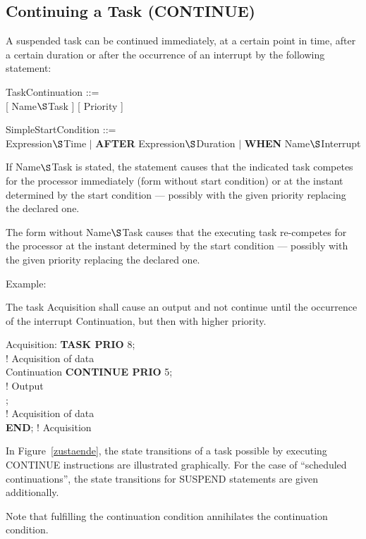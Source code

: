 \subsection{Continuing a Task (CONTINUE)}    %

A suspended task can be continued immediately, at a certain point in
time, after a certain duration or after the occurrence of an interrupt by
the following statement:

TaskContinuation ::=\\
 [ Name$\S $Task ] [ Priority ]\

SimpleStartCondition ::= \\
 Expression$\S $Time $\mid$ {\bf AFTER} Expression$\S $Duration $\mid$ {\bf WHEN} Name$\S $Interrupt

If Name$\S $Task is stated, the statement causes that the indicated task
competes for the processor immediately (form without start condition) or
at the instant determined by the start condition --- possibly with the
given priority replacing the declared one.

The form without Name$\S $Task causes that the executing task re-competes
for the processor at the instant determined by the start condition ---
possibly with the given priority replacing the declared one.

Example:

The task Acquisition shall cause an output and not continue until
the occurrence of the interrupt Continuation, but then with higher
priority.

\begin{tabbing}
Acquisition: \= {\bf TASK PRIO} 8;\\
      \> \x \x ! Acquisition of data\\
      \>  Continuation {\bf CONTINUE PRIO} 5;\\
      \> \x \x ! Output\\
      \> ;\\
      \> \x \x ! Acquisition of data\\
      \> {\bf END}; ! Acquisition
\end{tabbing}

In Figure~\ref{zustaende},
the state transitions of a task possible by executing CONTINUE
instructions are illustrated graphically. For the case of
``scheduled continuations'', the state transitions for SUSPEND statements are
given additionally.
\begin{added}
Note that fulfilling the continuation condition annihilates the
continuation condition.
\end{added}

